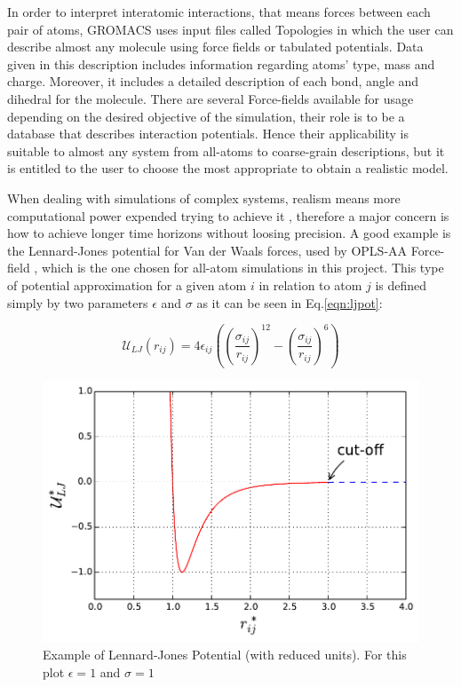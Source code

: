 \documentclass[10pt,a4paper,twoside]{article}
\begin{document}
 In order to interpret interatomic interactions, that means forces between each pair of atoms, GROMACS uses input files called Topologies in which the user can describe almost any molecule using force fields or tabulated potentials. Data given in this description includes information regarding atoms' type, mass and charge. Moreover, it includes a detailed description of each bond, angle and dihedral for the molecule. There are several Force-fields available for usage depending on the desired objective of the simulation, their role is to be a database that describes interaction potentials. Hence their applicability is suitable to almost any system from all-atoms to coarse-grain descriptions, but it is entitled to the user to choose the most appropriate to obtain a realistic model.
 
  When dealing with simulations of complex systems, realism means more computational power expended trying to achieve it \cite{satoh}, therefore a major concern is how to achieve longer time horizons without loosing precision. A good example is the Lennard-Jones potential for Van der Waals forces, used by OPLS-AA Force-field \cite{opls}, which is the one chosen for all-atom simulations in this project. This type of potential approximation for a given atom $i$ in relation to atom $j$ is defined simply by two parameters  $\epsilon$ and $\sigma$ as it can be seen in Eq.\ref{eqn:ljpot}:

\begin{equation}
\mathcal{U}_{LJ}(r_{ij}) = 4\epsilon_{ij}\left(\left( \dfrac{\sigma_{ij}}{r_{ij}}\right)^{12} - \left( \dfrac{\sigma_{ij}}{r_{ij}}\right)^6\right) 
\label{eqn:ljpot}
\end{equation}

 \begin{figure}[ht]
  \begin{center}
	\includegraphics[width=0.6 \textwidth]{./graphs/lj}
	\caption{Example of Lennard-Jones Potential (with reduced units). For this plot $\epsilon = 1$ and $\sigma = 1$ }
	\label{gfx:ljg}
	\end{center}
	\end{figure}
\end{document}
